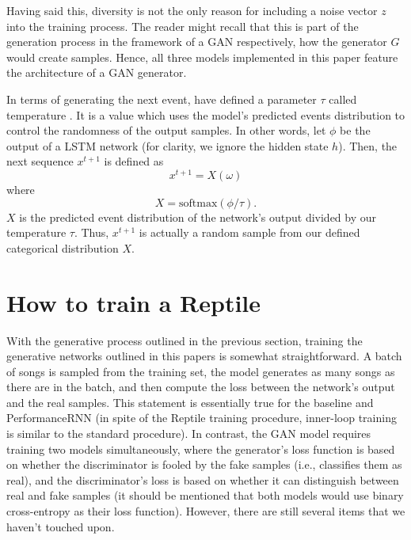 \documentclass[a4paper]{book}
\begin{document}
Having said this, diversity is not the only reason for including a noise vector $z$ into the training process. The reader might recall that this is part of the generation process in the framework of a GAN respectively, how the generator $G$ would create samples. Hence, all three models implemented in this paper feature the architecture of a GAN generator.

In terms of generating the next event, \textcite{oore_this_2018} have defined a parameter $\tau$ called temperature \parencite{google_magenta_performance_2017}. It is a value which uses the model's predicted events distribution to control the randomness of the output samples. In other words, let $\phi$ be the output of a LSTM network (for clarity, we ignore the hidden state $h$). Then, the next sequence $x^{t+1}$ is defined as 
\begin{equation}
    x^{t+1} = X(\omega)
\end{equation}
where
\begin{equation}
    X = \text{softmax}(\phi / \tau).
\end{equation}
$X$ is the predicted event distribution of the network's output divided by our temperature $\tau$. Thus, $x^{t+1}$ is actually a random sample from our defined categorical distribution $X$.

\section{How to train a Reptile} \label{sec:reptile_train}

With the generative process outlined in the previous section, training the generative networks outlined in this papers is somewhat straightforward. A batch of songs is sampled from the training set, the model generates as many songs as there are in the batch, and then compute the loss between the network's output and the real samples. This statement is essentially true for the baseline and PerformanceRNN (in spite of the Reptile training procedure, inner-loop training is similar to the standard procedure). In contrast, the GAN model requires training two models simultaneously, where the generator's loss function is based on whether the discriminator is fooled by the fake samples (i.e., classifies them as real), and the discriminator's loss is based on whether it can distinguish between real and fake samples (it should be mentioned that both models would use binary cross-entropy as their loss function). However, there are still several items that we haven't touched upon.
\end{document}

